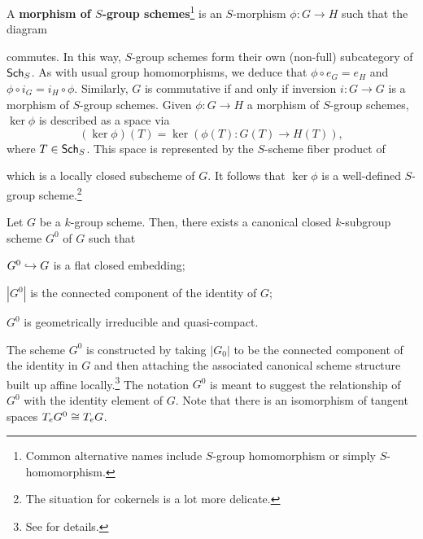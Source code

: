 \documentclass[11pt]{article}
\begin{document}
A \textbf{morphism of $S$-group schemes}\footnote{Common alternative names include $S$-group homomorphism or simply $S$-homomorphism.} is an $S$-morphism $\phi: G\to H$ such that the diagram
\begin{center}
\end{center}
commutes. In this way, $S$-group schemes form their own (non-full) subcategory of $\operatorname{\mathsf{Sch}}_S$. As with usual group homomorphisms, we deduce that $\phi\circ e_G=e_H$ and $\phi\circ i_G=i_H\circ\phi$. Similarly, $G$ is commutative if and only if inversion $i: G\to G$ is a morphism of $S$-group schemes. Given $\phi: G\to H$ a morphism of $S$-group schemes, $\ker\phi$ is described as a space via
$$(\ker\phi)(T)=\ker(\phi(T): G(T)\to H(T)),$$
where $T\in\operatorname{\mathsf{Sch}}_S$. This space is represented by the $S$-scheme fiber product of 
\begin{center}
\end{center}
which is a locally closed subscheme of $G$. It follows that $\ker\phi$ is a well-defined $S$-group scheme.\footnote{The situation for cokernels is a lot more delicate.}

\begin{proposition}\label{identity_connected_component}
Let $G$ be a $k$-group scheme. Then, there exists a canonical closed $k$-subgroup scheme $G^0$ of $G$ such that
\begin{enum}{\arabic}
\item $G^0\hookrightarrow G$ is a flat closed embedding;
\item $|G^0|$ is the connected component of the identity of $G$;
\item $G^0$ is geometrically irreducible and quasi-compact.
\end{enum}
\end{proposition}

The scheme $G^0$ is constructed by taking $|G_0|$ to be the connected component of the identity in $G$ and then attaching the associated canonical scheme structure built up affine locally.\footnote{See \cite[\textrm{Tag 047J}]{Stack} for details.} The notation $G^0$ is meant to suggest the relationship of $G^0$ with the identity element of $G$. Note that there is an isomorphism of tangent spaces $T_eG^0\cong T_eG$.
\end{document}
